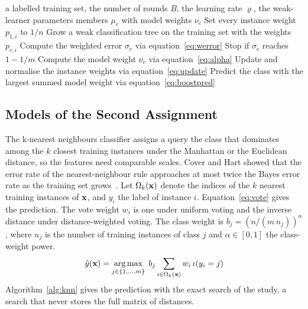\documentclass[10pt,conference]{IEEEtran}
\begin{document}
\begin{algorithm}[b]
\caption{Multi-class adaptive boosting}
\label{alg:samme}
\begin{algorithmic}[1]
\Require a labelled training set, the number of rounds $B$, the learning rate $\varrho$, the weak-learner parameters
\Ensure members $\mu_c$ with model weights $\nu_c$
\State Set every instance weight $p_{1,i}$ to $1/n$
    \State Grow a weak classification tree on the training set with the weights $p_{c,i}$
    \State Compute the weighted error $\sigma_c$ via equation~\eqref{eq:werror}
    \State Stop if $\sigma_c$ reaches $1 - 1/m$
    \State Compute the model weight $\nu_c$ via equation~\eqref{eq:alpha}
    \State Update and normalise the instance weights via equation~\eqref{eq:update}
\EndFor
\State Predict the class with the largest summed model weight via equation~\eqref{eq:boostpred}
\end{algorithmic}
\end{algorithm}

\subsection{Models of the Second Assignment}
\label{sec:bg-baselines}

The k-nearest neighbours classifier assigns a query the class that dominates among the $k$ closest training instances under the Manhattan or the Euclidean distance, so the features need comparable scales. Cover and Hart showed that the error rate of the nearest-neighbour rule approaches at most twice the Bayes error rate as the training set grows~\cite{cover1967}. Let $\Omega_k(\mathbf{x})$ denote the indices of the $k$ nearest training instances of $\mathbf{x}$, and $y_i$ the label of instance $i$. Equation~\eqref{eq:vote} gives the prediction. The vote weight $w_i$ is one under uniform voting and the inverse distance under distance-weighted voting. The class weight is $b_j = (n / (m \, n_j))^{\alpha}$, where $n_j$ is the number of training instances of class $j$ and $\alpha \in [0, 1]$ the class-weight power.
\begin{equation}
\label{eq:vote}
\hat{y}(\mathbf{x}) = \operatorname*{arg\,max}_{j \in \{1, \ldots, m\}} \; b_j \sum_{i \in \Omega_k(\mathbf{x})} w_i \, \iota(y_i = j)
\end{equation}
Algorithm~\ref{alg:knn} gives the prediction with the exact search of the study, a search that never stores the full matrix of distances.
\end{document}
